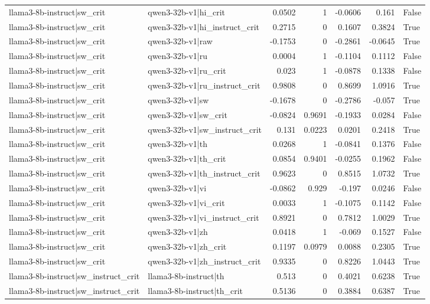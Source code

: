 \begin{table}
\begin{tabular}{l l r r r r l}
llama3-8b-instruct|sw_crit & qwen3-32b-v1|hi_crit & 0.0502 & 1 & -0.0606 & 0.161 & False \\
llama3-8b-instruct|sw_crit & qwen3-32b-v1|hi_instruct_crit & 0.2715 & 0 & 0.1607 & 0.3824 & True \\
llama3-8b-instruct|sw_crit & qwen3-32b-v1|raw & -0.1753 & 0 & -0.2861 & -0.0645 & True \\
llama3-8b-instruct|sw_crit & qwen3-32b-v1|ru & 0.0004 & 1 & -0.1104 & 0.1112 & False \\
llama3-8b-instruct|sw_crit & qwen3-32b-v1|ru_crit & 0.023 & 1 & -0.0878 & 0.1338 & False \\
llama3-8b-instruct|sw_crit & qwen3-32b-v1|ru_instruct_crit & 0.9808 & 0 & 0.8699 & 1.0916 & True \\
llama3-8b-instruct|sw_crit & qwen3-32b-v1|sw & -0.1678 & 0 & -0.2786 & -0.057 & True \\
llama3-8b-instruct|sw_crit & qwen3-32b-v1|sw_crit & -0.0824 & 0.9691 & -0.1933 & 0.0284 & False \\
llama3-8b-instruct|sw_crit & qwen3-32b-v1|sw_instruct_crit & 0.131 & 0.0223 & 0.0201 & 0.2418 & True \\
llama3-8b-instruct|sw_crit & qwen3-32b-v1|th & 0.0268 & 1 & -0.0841 & 0.1376 & False \\
llama3-8b-instruct|sw_crit & qwen3-32b-v1|th_crit & 0.0854 & 0.9401 & -0.0255 & 0.1962 & False \\
llama3-8b-instruct|sw_crit & qwen3-32b-v1|th_instruct_crit & 0.9623 & 0 & 0.8515 & 1.0732 & True \\
llama3-8b-instruct|sw_crit & qwen3-32b-v1|vi & -0.0862 & 0.929 & -0.197 & 0.0246 & False \\
llama3-8b-instruct|sw_crit & qwen3-32b-v1|vi_crit & 0.0033 & 1 & -0.1075 & 0.1142 & False \\
llama3-8b-instruct|sw_crit & qwen3-32b-v1|vi_instruct_crit & 0.8921 & 0 & 0.7812 & 1.0029 & True \\
llama3-8b-instruct|sw_crit & qwen3-32b-v1|zh & 0.0418 & 1 & -0.069 & 0.1527 & False \\
llama3-8b-instruct|sw_crit & qwen3-32b-v1|zh_crit & 0.1197 & 0.0979 & 0.0088 & 0.2305 & True \\
llama3-8b-instruct|sw_crit & qwen3-32b-v1|zh_instruct_crit & 0.9335 & 0 & 0.8226 & 1.0443 & True \\
llama3-8b-instruct|sw_instruct_crit & llama3-8b-instruct|th & 0.513 & 0 & 0.4021 & 0.6238 & True \\
llama3-8b-instruct|sw_instruct_crit & llama3-8b-instruct|th_crit & 0.5136 & 0 & 0.3884 & 0.6387 & True \\

\end{tabular}
\end{table}
